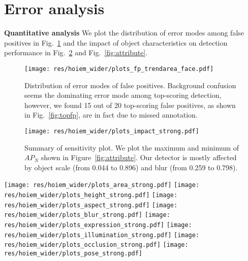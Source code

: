 \documentclass[10pt,twocolumn,letterpaper]{article}
\begin{document}
\appendix

\section{Error analysis}
\label{sec:error-analysis}

{\bf Quantitative analysis}
We plot the distribution of error modes among false positives in Fig.~\ref{fig:error} and the impact of object characteristics on detection performance in Fig.~\ref{fig:impact} and Fig.~\ref{fig:attribute}. 

\begin{figure}
  \centering
  \texttt{[image: res/hoiem\_wider/plots\_fp\_trendarea\_face.pdf]}
  \caption{\label{fig:error} Distribution of error modes of false positives. Background confusion seems the dominating error mode among top-scoring detection, however, we found 15 out of 20 top-scoring false positives, as shown in Fig.~\ref{fig:topfp}, are in fact due to missed annotation. }
\end{figure}

\begin{figure}
  \centering
  \texttt{[image: res/hoiem\_wider/plots\_impact\_strong.pdf]}
  \caption{\label{fig:impact} Summary of sensitivity plot. We plot the maximum and minimum of $AP_N$ shown in Figure~\ref{fig:attribute}. Our detector is mostly affected by object scale (from 0.044 to 0.896) and blur (from 0.259 to 0.798).}
\end{figure}

\begin{figure*}
  \centering
  \texttt{[image: res/hoiem\_wider/plots\_area\_strong.pdf]}
  \texttt{[image: res/hoiem\_wider/plots\_height\_strong.pdf]}
  \texttt{[image: res/hoiem\_wider/plots\_aspect\_strong.pdf]}
  \texttt{[image: res/hoiem\_wider/plots\_blur\_strong.pdf]}
  \texttt{[image: res/hoiem\_wider/plots\_expression\_strong.pdf]}
  \texttt{[image: res/hoiem\_wider/plots\_illumination\_strong.pdf]}
  \texttt{[image: res/hoiem\_wider/plots\_occlusion\_strong.pdf]}
  \texttt{[image: res/hoiem\_wider/plots\_pose\_strong.pdf]}
  \caption{Sensitivity and impact of object characteristics. We show normalized AP\cite{hoiem2012diagnosing} for each characteristics. Please refer to \cite{hoiem2012diagnosing} for definition of ``BBox Area'', ``BBox Height'', and ``Aspect Ratio'' and also refer to \cite{yang2016wider} for the definition of per-face attributes ``Blur'', ``Expression'', ``Illumination'', ``Occlusion'', and ``Pose''. Our detector performs under average in the case of extremely small scale, extremely skewed aspect ratio, heavy blur, and heavy occlusion. Surprisingly, exaggerated expression and extreme illumination correlate with better performance. Pose variation does not have noticeable affect. }
  \label{fig:attribute}
\end{figure*}
\end{document}
